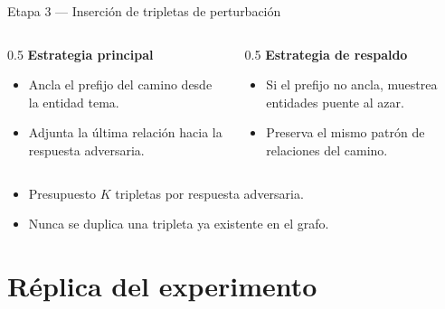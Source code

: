 \documentclass[aspectratio=169]{beamer}
\begin{document}
\begin{frame}{Etapa 3 --- Inserción de tripletas de perturbación}
  \begin{columns}
    \begin{column}{0.5\textwidth}
      \textbf{Estrategia principal}
      \begin{itemize}
        \item Ancla el prefijo del camino desde la entidad tema.
        \item Adjunta la última relación hacia la respuesta adversaria.
      \end{itemize}
    \end{column}
    \begin{column}{0.5\textwidth}
      \textbf{Estrategia de respaldo}
      \begin{itemize}
        \item Si el prefijo no ancla, muestrea entidades puente al azar.
        \item Preserva el mismo patrón de relaciones del camino.
      \end{itemize}
    \end{column}
  \end{columns}
  \vspace{1em}
  \begin{itemize}
    \item Presupuesto $K$ tripletas por respuesta adversaria.
    \item Nunca se duplica una tripleta ya existente en el grafo.
  \end{itemize}
\end{frame}

\section{Réplica del experimento}
\end{document}
